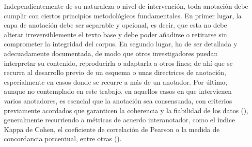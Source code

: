 Independientemente de su naturaleza o nivel de intervención, toda anotación debe cumplir con ciertos principios metodológicos fundamentales. En primer lugar, la capa de anotación debe ser separable y opcional, es decir, que esta no debe alterar irreversiblemente el texto base y debe poder añadirse o retirarse sin comprometer la integridad del corpus. En segundo lugar, ha de ser detallada y adecuadamente documentada, de modo que otros investigadores puedan interpretar su contenido, reproducirla o adaptarla a otros fines; de ahí que se recurra al desarrollo previo de un esquema o unas directrices de anotación, especialmente en casos donde se recurre a más de un anotador. Por último, aunque no contemplado en este trabajo, en aquellos casos en que intervienen varios anotadores, es esencial que la anotación sea consensuada, con criterios previamente acordados que garanticen la coherencia y la fiabilidad de los datos (\cite{leech2004}), generalmente recurriendo a métricas de acuerdo interanotador, como el índice Kappa de Cohen, el coeficiente de correlación de Pearson o la medida de concordancia porcentual, entre otras (\cite{artstein2017inter}).

